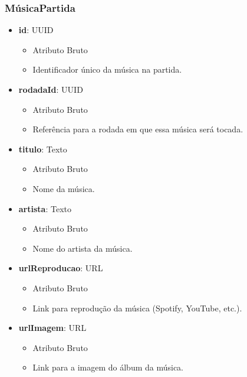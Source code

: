     \subsubsection{MúsicaPartida}
    \begin{itemize}
        \item \textbf{id}: UUID  
              \begin{itemize}
                  \item Atributo Bruto
                  \item Identificador único da música na partida.
              \end{itemize}
    
        \item \textbf{rodadaId}: UUID  
              \begin{itemize}
                  \item Atributo Bruto
                  \item Referência para a rodada em que essa música será tocada.
              \end{itemize}
    
        \item \textbf{titulo}: Texto  
              \begin{itemize}
                  \item Atributo Bruto
                  \item Nome da música.
              \end{itemize}
    
        \item \textbf{artista}: Texto  
              \begin{itemize}
                  \item Atributo Bruto
                  \item Nome do artista da música.
              \end{itemize}
    
        \item \textbf{urlReproducao}: URL  
              \begin{itemize}
                  \item Atributo Bruto
                  \item Link para reprodução da música (Spotify, YouTube, etc.).
              \end{itemize}
    
        \item \textbf{urlImagem}: URL  
              \begin{itemize}
                  \item Atributo Bruto
                  \item Link para a imagem do álbum da música.
              \end{itemize}
    

\end{itemize}
